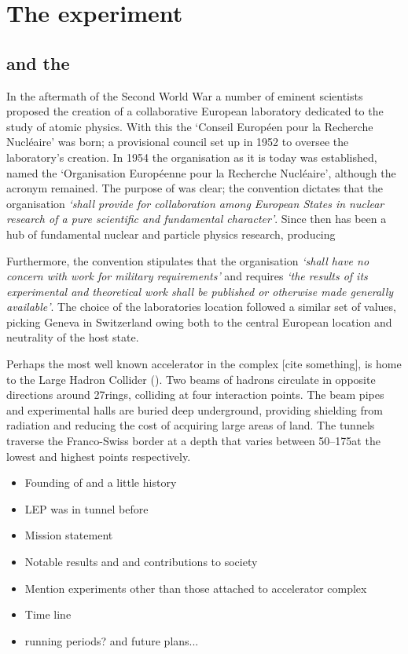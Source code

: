 \chapter{The \lhcb experiment} 
\label{ch:detector}
\minitoc
 


\section{\cern and the \lhc}


In the aftermath of the Second World War a number of eminent scientists proposed the creation of a collaborative European laboratory dedicated to the study of atomic physics. With this the `Conseil Europ\'een pour la Recherche Nucl\'eaire' was born; a provisional council set up in 1952 to oversee the laboratory's creation.  In 1954 the organisation as it is today was established, named the `Organisation Europ\'eenne pour la Recherche Nucl\'eaire', although the acronym \cern remained. 
The purpose of \cern was clear; the convention dictates that the organisation \emph{`shall provide for collaboration among European States in nuclear research of a pure scientific and fundamental character'}.
Since then \cern has been a hub of fundamental nuclear and particle physics research, producing 

Furthermore, the convention stipulates that the organisation \emph{`shall have no concern with work for military requirements'} and  
requires \emph{`the results of its experimental and theoretical work shall be published or otherwise made generally available'}. 
The choice of the laboratories location followed a similar set of values, picking Geneva in Switzerland owing both to the central European location and neutrality of the host state. 


Perhaps the most well known accelerator in the complex [cite something], \cern is home to the Large Hadron Collider (\lhc). Two beams of hadrons circulate in opposite directions around 27\km rings, colliding at four interaction points. The beam pipes and experimental halls are buried deep underground, providing shielding from radiation and reducing the cost of acquiring large areas of land. The tunnels traverse the Franco-Swiss border at a depth that varies between 50--175\m at the lowest and highest points respectively.      


{\color{Red}
\begin{itemize}
\item Founding of \cern and a little history 
\item LEP was in tunnel before
\item Mission statement
\item Notable results and and contributions to society
\item Mention experiments other than those attached to accelerator complex
\item Time line
\item running periods? and future plans...
\end{itemize}
}

